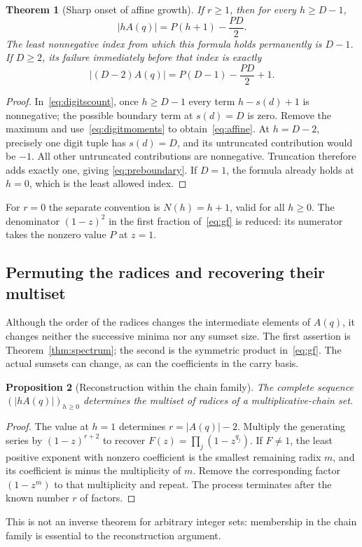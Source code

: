 \documentclass[11pt]{article}
\numberwithin{equation}{section}
\newtheorem{theorem}{Theorem}[section]
\newtheorem{proposition}[theorem]{Proposition}
\theoremstyle{definition}
\theoremstyle{remark}\newtheorem{remark}[theorem]{Remark}
\begin{document}
\begin{theorem}[Sharp onset of affine growth]\label{thm:affine}
If $r\ge1$, then for every $h\ge D-1$,
\begin{equation}\label{eq:affine}
 |hA(q)|=P(h+1)-\frac{PD}{2}.
\end{equation}
The least nonnegative index from which this formula holds permanently is
$D-1$.  If $D\ge2$, its failure immediately before that index is exactly
\begin{equation}\label{eq:preboundary}
 |(D-2)A(q)|=P(D-1)-\frac{PD}{2}+1.
\end{equation}
\end{theorem}
\begin{proof}
In~\eqref{eq:digitscount}, once $h\ge D-1$ every term $h-s(d)+1$ is
nonnegative; the possible boundary term at $s(d)=D$ is zero.  Remove the
maximum and use~\eqref{eq:digitmoments} to obtain~\eqref{eq:affine}.
At $h=D-2$, precisely one digit tuple has $s(d)=D$, and its untruncated
contribution would be $-1$.  All other untruncated contributions are
nonnegative.  Truncation therefore adds exactly one, giving
\eqref{eq:preboundary}.  If $D=1$, the formula already holds at $h=0$,
which is the least allowed index.
\end{proof}
For $r=0$ the separate convention is $N(h)=h+1$, valid for all $h\ge0$.
The denominator $(1-z)^2$ in the first fraction of~\eqref{eq:gf} is
reduced: its numerator takes the nonzero value $P$ at $z=1$.

\subsection{Permuting the radices and recovering their multiset}

Although the order of the radices changes the intermediate elements of
$A(q)$, it changes neither the successive minima nor any sumset size.
The first assertion is Theorem~\ref{thm:spectrum}; the second is the
symmetric product in~\eqref{eq:gf}.  The actual sumsets can change, as can
the coefficients in the carry basis.

\begin{proposition}[Reconstruction within the chain family]
\label{prop:reconstruct}
The complete sequence $(|hA(q)|)_{h\ge0}$ determines the multiset of
radices of a multiplicative-chain set.
\end{proposition}
\begin{proof}
The value at $h=1$ determines $r=|A(q)|-2$.  Multiply the generating series
by $(1-z)^{r+2}$ to recover $F(z)=\prod_j(1-z^{q_j})$.
If $F\ne1$, the least positive exponent with nonzero coefficient is the
smallest remaining radix $m$, and its coefficient is minus the multiplicity
of $m$.  Remove the corresponding factor $(1-z^m)$ to that multiplicity
and repeat.  The process terminates after the known number $r$ of factors.
\end{proof}
This is not an inverse theorem for arbitrary integer sets: membership in
the chain family is essential to the reconstruction argument.
\end{document}

